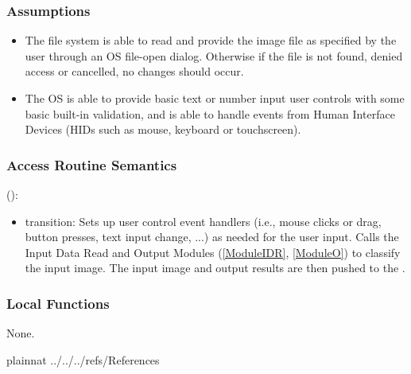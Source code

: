\documentclass[12pt, titlepage]{article}
\begin{document}
\subsubsection{Assumptions}

\begin{itemize}
  \item The file system is able to read and provide the image file as specified by the user through an OS file-open dialog.
  Otherwise if the file is not found, denied access or cancelled, no changes should occur.
  \item The OS is able to provide basic text or number input user controls with some basic built-in validation, and
  is able to handle events from Human Interface Devices (HIDs such as mouse, keyboard or touchscreen).
\end{itemize}


\subsubsection{Access Routine Semantics}

\noindent {}():
\begin{itemize}
\item transition: Sets up user control event handlers (i.e., mouse clicks or drag, button presses, text input change, ...) 
as needed for the user input. Calls the Input Data Read and Output Modules (\ref{ModuleIDR}, \ref{ModuleO}) to classify the input
image. The input image and output results are then pushed to the .
\end{itemize}

\subsubsection{Local Functions}

None.
  
\newpage

 {plainnat}
 {../../../refs/References}
\end{document}
